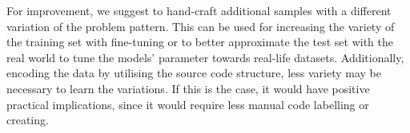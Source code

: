 For improvement, we suggest to hand-craft additional samples with a different variation of the problem pattern. This can be used for increasing the variety of the training set with fine-tuning or to better approximate the test set with the real world to tune the models' parameter towards real-life datasets. Additionally, encoding the data by utilising the source code structure, less variety may be necessary to learn the variations. If this is the case, it would have positive practical implications, since it would require less manual code labelling or creating.



